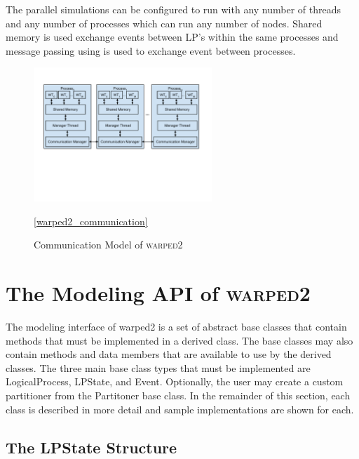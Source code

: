 \documentclass[11pt]{book}
\begin{document}
The parallel simulations can be configured to run with any number of threads and any number of
processes which can run any number of nodes. Shared memory is used exchange events between LP’s
within the same processes and message passing using is used to exchange event between processes.


\begin{figure}
  \centering
  \includegraphics[width=0.6\textwidth]{figs/Warped2-Communication.pdf}
  \caption{Communication Model of \textsc{warped2}}\ref{warped2_communication}
\end{figure}


\section{The Modeling API of \textsc{warped2}}

The modeling interface of warped2 is a set of abstract base classes that contain methods
that must be implemented in a derived class. The base classes may also contain methods and data
members that are available to use by the derived classes. The three main base class types that must
be implemented are LogicalProcess, LPState, and Event. Optionally, the user may create a
custom partitioner from the Partitoner base class. In the remainder of this section, each class
is described in more detail and sample implementations are shown for each.

\subsection{The LPState Structure}
\end{document}
